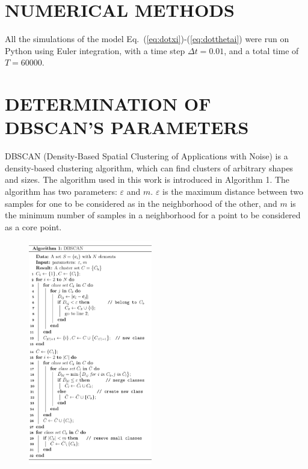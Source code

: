 \documentclass[%
 aip,
 amsmath,amssymb,
 reprint,%
]{revtex4-1}
\begin{document}
\section{\label{sec:numerics} NUMERICAL METHODS}

All the simulations of the model Eq.~(\ref{eq:dotxi})-(\ref{eq:dotthetai}) were run on Python using Euler integration, with a time step $\Delta t=0.01$, and a total time of $T=60000$. 


\section{\label{sec:DBSCAN_param} DETERMINATION OF DBSCAN'S PARAMETERS}

DBSCAN (Density-Based Spatial Clustering of Applications with Noise) is a density-based clustering algorithm, which can find clusters of arbitrary shapes and sizes. The algorithm used in this work is introduced in Algorithm 1.
The algorithm has two parameters: $\varepsilon$ and $m$. $\varepsilon$ is the maximum distance between two samples for one to be considered as in the neighborhood of the other, and $m$ is the minimum number of samples in a neighborhood for a point to be considered as a core point. 

\begin{figure}
    \includegraphics[width=0.48\textwidth]{./algorithm/algo.pdf}\label{algo:DBSCAN}
\end{figure}
\end{document}
